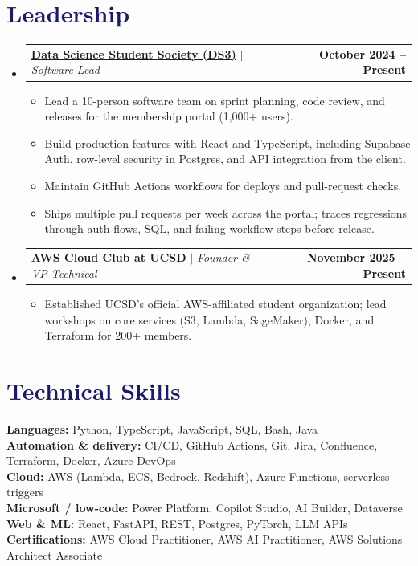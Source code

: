 \documentclass[letterpaper,11pt]{article}
\makeatletter
\newcommand{\resumeItem}[1]{
  \item\small{
    {#1 \vspace{-2pt}}
  }
}
\newcommand{\resumeProjectHeading}[2]{
    \item
    \begin{tabular*}{1.001\textwidth}{l@{\extracolsep{\fill}}r}
      \small#1 & \textbf{\small #2}\\
    \end{tabular*}\vspace{-7pt}
}
\newcommand{\resumeSubHeadingListStart}{\begin{itemize}[leftmargin=0.0in, label={}]}
\newcommand{\resumeSubHeadingListEnd}{\end{itemize}}
\newcommand{\resumeItemListStart}{\begin{itemize}}
\newcommand{\resumeItemListEnd}{\end{itemize}\vspace{-5pt}}
\newcommand\accentColor{MidnightBlue}
\makeatother
\begin{document}
\section{\textcolor{\accentColor}{Leadership}}
\vspace{-7pt}
\resumeSubHeadingListStart
\resumeProjectHeading{\textbf{\href{https://www.ds3atucsd.com/}{\underline{Data Science Student Society (DS3)}}} $|$ \emph{Software Lead}}{October 2024 -- Present}
\resumeItemListStart
\resumeItem{Lead a 10-person software team on sprint planning, code review, and releases for the membership portal (1,000+ users).}
\resumeItem{Build production features with React and TypeScript, including Supabase Auth, row-level security in Postgres, and API integration from the client.}
\resumeItem{Maintain GitHub Actions workflows for deploys and pull-request checks.}
\resumeItem{Ships multiple pull requests per week across the portal; traces regressions through auth flows, SQL, and failing workflow steps before release.}
\resumeItemListEnd
\vspace{-15pt}
\resumeProjectHeading{\textbf{AWS Cloud Club at UCSD} $|$ \emph{Founder \& VP Technical}}{November 2025 -- Present}
\resumeItemListStart
\resumeItem{Established UCSD's official AWS-affiliated student organization; lead workshops on core services (S3, Lambda, SageMaker), Docker, and Terraform for 200+ members.}
\resumeItemListEnd
\resumeSubHeadingListEnd
\vspace{-15pt}

\section{\textcolor{\accentColor}{Technical Skills}}
\begin{itemize}[leftmargin=0.15in, label={}]
  \small{\item{
        \textbf{Languages: }{Python, TypeScript, JavaScript, SQL, Bash, Java} \\
        \textbf{Automation \& delivery: }{CI/CD, GitHub Actions, Git, Jira, Confluence, Terraform, Docker, Azure DevOps} \\
        \textbf{Cloud: }{AWS (Lambda, ECS, Bedrock, Redshift), Azure Functions, serverless triggers} \\
        \textbf{Microsoft / low-code: }{Power Platform, Copilot Studio, AI Builder, Dataverse} \\
        \textbf{Web \& ML: }{React, FastAPI, REST, Postgres, PyTorch, LLM APIs} \\
        \textbf{Certifications: }{AWS Cloud Practitioner, AWS AI Practitioner, AWS Solutions Architect Associate}
        }}
\end{itemize}
\vspace{-10pt}
\end{document}
